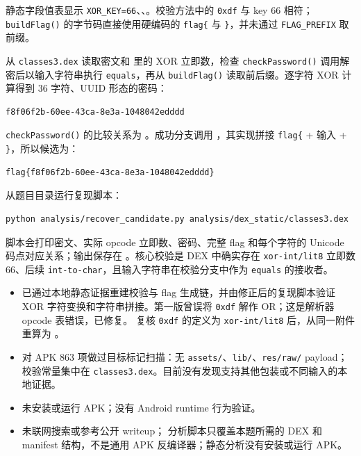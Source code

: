 静态字段值表显示 \texttt{XOR\_KEY=66}、\texttt{}、\texttt{}。校验方法中的 \texttt{0xdf} 与 key 66 相符；\texttt{buildFlag()} 的字节码直接使用硬编码的 \texttt{flag\{} 与 \texttt{\}}，并未通过 \texttt{FLAG\_PREFIX} 取前缀。

\texttt{} 从 \texttt{classes3.dex} 读取密文和 \texttt{} 里的 XOR 立即数，检查 \texttt{checkPassword()} 调用解密后以输入字符串执行 \texttt{equals}，再从 \texttt{buildFlag()} 读取前后缀。逐字符 XOR 计算得到 36 字符、UUID 形态的密码：

\begin{verbatim}
f8f06f2b-60ee-43ca-8e3a-1048042edddd
\end{verbatim}

\texttt{checkPassword()} 的比较关系为 \texttt{}。成功分支调用 \texttt{}，其实现拼接 \texttt{flag\{} + 输入 + \texttt{\}}，所以候选为：

\begin{verbatim}
flag{f8f06f2b-60ee-43ca-8e3a-1048042edddd}
\end{verbatim}

从题目目录运行复现脚本：

\begin{verbatim}
python analysis/recover_candidate.py analysis/dex_static/classes3.dex
\end{verbatim}

脚本会打印密文、实际 opcode 立即数、密码、完整 flag 和每个字符的 Unicode 码点对应关系；输出保存在 \texttt{}。核心校验是 DEX 中确实存在 \texttt{xor-int/lit8} 立即数 66、后续 \texttt{int-to-char}，且输入字符串在校验分支中作为 \texttt{equals} 的接收者。

\begin{itemize}
\tightlist
\item
  已通过本地静态证据重建校验与 flag 生成链，并由修正后的复现脚本验证 XOR 字符变换和字符串拼接。第一版曾误将 \texttt{0xdf} 解作 OR；这是解析器 opcode 表错误，已修复。 复核 \texttt{0xdf} 的定义为 \texttt{xor-int/lit8} 后，从同一附件重算为 \texttt{}。
\item
  对 APK 863 项做过目标标记扫描：无 \texttt{assets/}、\texttt{lib/}、\texttt{res/raw/} payload；校验常量集中在 \texttt{classes3.dex}。目前没有发现支持其他包装或不同输入的本地证据。
\item
  未安装或运行 APK；没有 Android runtime 行为验证。
\item
  未联网搜索或参考公开 writeup； 分析脚本只覆盖本题所需的 DEX 和 manifest 结构，不是通用 APK 反编译器；静态分析没有安装或运行 APK。
\end{itemize}

